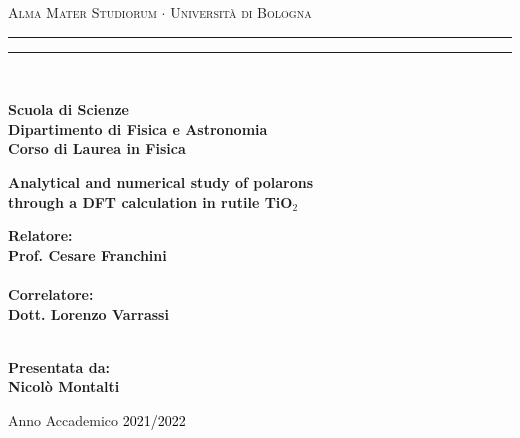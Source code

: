 \begin{titlepage}


    \begin{center}
        {{\Large{\textsc{Alma Mater Studiorum $\cdot$ Universit\`a di Bologna}}}}
        \rule[0.1cm]{15.8cm}{0.1mm}
        \rule[0.5cm]{15.8cm}{0.6mm}
        \\\vspace{3mm}

        {\small{\bf Scuola di Scienze \\
                Dipartimento di Fisica e Astronomia\\
                Corso di Laurea in Fisica}}

    \end{center}

    \vspace{23mm}
    \centering
    \begin{center}%
        {\LARGE{\bf Analytical and numerical study of polarons \\ through  a DFT calculation in rutile TiO$_2$}}\\
    \end{center}

    \vspace{50mm} \par \noindent

    \begin{minipage}[t]{0.47\textwidth}
        {\large{\bf Relatore:
                \vspace{2mm}\\
                Prof. Cesare Franchini}} \\\\
        \bf Correlatore:
        \vspace{2mm}\\
        Dott. Lorenzo Varrassi\\\\
    \end{minipage}
    \hfill
    \begin{minipage}[t]{0.47\textwidth}\raggedleft
        {\large{\bf Presentata da:
                \\
                \vspace{2mm}
                Nicolò Montalti}}
    \end{minipage}

    \vfill

    \begin{center}
        Anno Accademico \textcolor{black}{2021/2022}
    \end{center}

\end{titlepage}
\restoregeometry